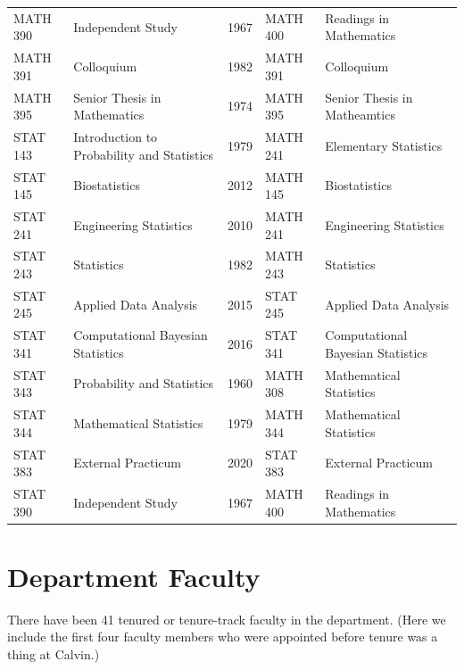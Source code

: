 \documentclass[
]{book}
\begin{document}
\begin{table}
\begin{tabular}[t]{llrll}
MATH 390 & Independent Study & 1967 & MATH 400 & Readings in Mathematics\\
MATH 391 & Colloquium & 1982 & MATH 391 & Colloquium\\
MATH 395 & Senior Thesis in Mathematics & 1974 & MATH 395 & Senior Thesis in Matheamtics\\
STAT 143 & Introduction to Probability and Statistics & 1979 & MATH 241 & Elementary Statistics\\
\addlinespace
STAT 145 & Biostatistics & 2012 & MATH 145 & Biostatistics\\
STAT 241 & Engineering Statistics & 2010 & MATH 241 & Engineering Statistics\\
STAT 243 & Statistics & 1982 & MATH 243 & Statistics\\
STAT 245 & Applied Data Analysis & 2015 & STAT 245 & Applied Data Analysis\\
STAT 341 & Computational Bayesian Statistics & 2016 & STAT 341 & Computational Bayesian Statistics\\
\addlinespace
STAT 343 & Probability and Statistics & 1960 & MATH 308 & Mathematical Statistics\\
STAT 344 & Mathematical Statistics & 1979 & MATH 344 & Mathematical Statistics\\
STAT 383 & External Practicum & 2020 & STAT 383 & External Practicum\\
STAT 390 & Independent Study & 1967 & MATH 400 & Readings in Mathematics\\
\bottomrule
\end{tabular}
\end{table}

\hypertarget{department-faculty}{%
\chapter{Department Faculty}\label{department-faculty}}

There have been 41 tenured or tenure-track faculty in the department. (Here we include the first four faculty members who were appointed before tenure was a thing at Calvin.)
\end{document}
